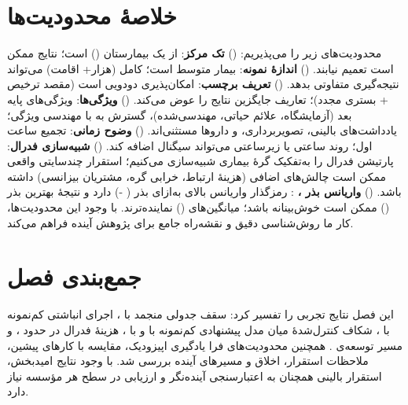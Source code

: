 \section{خلاصۀ محدودیت‌ها}

محدودیت‌های زیر را می‌پذیریم: () \textbf{تک مرکز}:  از یک بیمارستان () است؛ نتایج ممکن است تعمیم نیابند. () \textbf{اندازۀ نمونه}:  بیمار متوسط است؛  کامل (هزار+ اقامت) می‌تواند نتیجه‌گیری متفاوتی بدهد. () \textbf{تعریف برچسب}: امکان‌پذیری دودویی است (مقصد ترخیص + بستری مجدد)؛ تعاریف جایگزین نتایج را عوض می‌کند. () \textbf{ویژگی‌ها}: ویژگی‌های پایه  بعد (آزمایشگاه، علائم حیاتی، مهندسی‌شده)، گسترش به  با مهندسی ویژگی؛ یادداشت‌های بالینی، تصویربرداری، و داروها مستثنی‌اند. () \textbf{وضوح زمانی}: تجمیع  ساعت اول؛ روند ساعتی یا زیرساعتی می‌تواند سیگنال اضافه کند. () \textbf{شبیه‌سازی فدرال}: پارتیشن فدرال را به‌تفکیک گرۀ بیماری شبیه‌سازی می‌کنیم؛ استقرار چندسایتی واقعی ممکن است چالش‌های اضافی (هزینۀ ارتباط، خرابی گره، مشتریان بیزانسی) داشته باشد. () \textbf{واریانس بذر ، }: رمزگذار   واریانس بالای به‌ازای بذر ( -) دارد و نتیجۀ بهترین بذر () ممکن است خوش‌بینانه باشد؛ میانگین‌های  () نماینده‌ترند. با وجود این محدودیت‌ها، کار ما روش‌شناسی دقیق و نقشه‌راه جامع برای پژوهش آینده فراهم می‌کند.

\section{جمع‌بندی فصل}

این فصل نتایج تجربی را تفسیر کرد: سقف جدولی منجمد با \textbf{}، اجرای انباشتی کم‌نمونه با \textbf{}، شکاف کنترل‌شدۀ  میان مدل پیشنهادی کم‌نمونه با \textbf{} و  با \textbf{}، هزینۀ فدرال در حدود  ، و مسیر توسعه‌ی . همچنین محدودیت‌های فرا یادگیری اپیزودیک، مقایسه با کارهای پیشین، ملاحظات استقرار، اخلاق و مسیرهای آینده بررسی شد. با وجود نتایج امیدبخش، استقرار بالینی همچنان به اعتبارسنجی آینده‌نگر و ارزیابی در سطح هر مؤسسه نیاز دارد.
